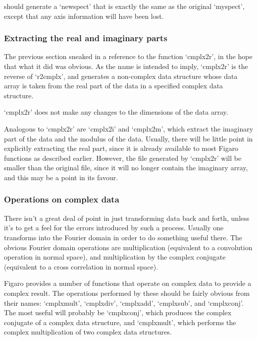    should generate a `newspect' that is exactly the same as the original
   `myspect', except that any axis information will have been lost.


\subsubsection{\label{techno6realimag}Extracting the real and imaginary parts}

   The previous section sneaked in a reference to the function
   `cmplx2r', in the hope that what it did was obvious.  As the name is
   intended to imply, `cmplx2r' is the reverse of `r2cmplx', and
   generates a non-complex data structure whose data array is taken from
   the real part of the data in a specified complex data structure.

   `cmplx2r' does not make any changes to the dimensions of the data
   array.

   Analogous to `cmplx2r' are `cmplx2i' and `cmplx2m', which extract the
   imaginary part of the data and the modulus of the data.  Usually,
   there will be little point in explicitly extracting the real part,
   since it is already available to most Figaro functions as described
   earlier.  However, the file generated by `cmplx2r' will be smaller
   than the original file, since it will no longer contain the imaginary
   array, and this may be a point in its favour.


\subsubsection{\label{techno6oper}Operations on complex data}

   There isn't a great deal of point in just transforming data back and
   forth, unless it's to get a feel for the errors introduced by such a
   process.  Usually one transforms into the Fourier domain in order to
   do something useful there.  The obvious Fourier domain operations are
   multiplication (equivalent to a convolution operation in normal
   space), and multiplication by the complex conjugate (equivalent to a
   cross correlation in normal space).

   Figaro provides a number of functions that operate on complex data to
   provide a complex result.  The operations performed by these should
   be fairly obvious from their names: `cmplxmult', `cmplxdiv',
   `cmplxadd', `cmplxsub', and `cmplxconj'.  The most useful will
   probably be `cmplxconj', which produces the complex conjugate of a
   complex data structure, and `cmplxmult', which performs the complex
   multiplication of two complex data structures.

